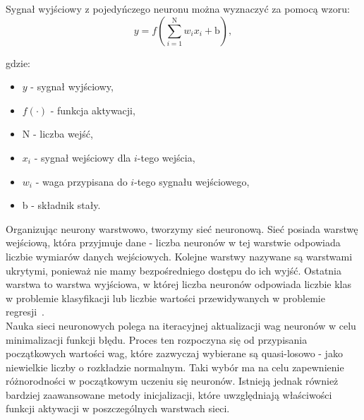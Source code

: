 \documentclass[a4paper,twoside,12pt]{book}
\begin{document}
Sygnał wyjściowy z pojedyńczego neuronu można wyznaczyć za pomocą wzoru:
\begin{equation}
	y = f\left( \sum_{i=1}^{\text{N}} w_i x_i + \text{b} \right),
\end{equation}

\noindent gdzie:
\begin{itemize}
	\item $y$ - sygnał wyjściowy,
	\item $f(\cdot)$ - funkcja aktywacji,
	\item N - liczba wejść,
	\item $x_i$ - sygnał wejściowy dla $i$-tego wejścia,
	\item $w_i$ - waga przypisana do $i$-tego sygnału wejściowego,
	\item b - składnik stały.
\end{itemize}


Organizując neurony warstwowo, tworzymy sieć neuronową. Sieć posiada warstwę wejściową, która przyjmuje dane - liczba neuronów w tej warstwie odpowiada liczbie wymiarów danych wejściowych. Kolejne warstwy nazywane są warstwami ukrytymi, ponieważ nie mamy bezpośredniego dostępu do ich wyjść. Ostatnia warstwa to warstwa wyjściowa, w której liczba neuronów odpowiada liczbie klas w problemie klasyfikacji lub liczbie wartości przewidywanych w problemie regresji~\cite{ksiazka_sieci_algorytmy}.\\






Nauka sieci neuronowych polega na iteracyjnej aktualizacji wag neuronów w celu minimalizacji funkcji błędu. Proces ten rozpoczyna się od przypisania początkowych wartości wag, które zazwyczaj wybierane są quasi-losowo - jako niewielkie liczby o rozkładzie normalnym. Taki wybór ma na celu zapewnienie różnorodności w początkowym uczeniu się neuronów. Istnieją jednak również bardziej zaawansowane metody inicjalizacji, które uwzględniają właściwości funkcji aktywacji w poszczególnych warstwach sieci.\\
\end{document}
